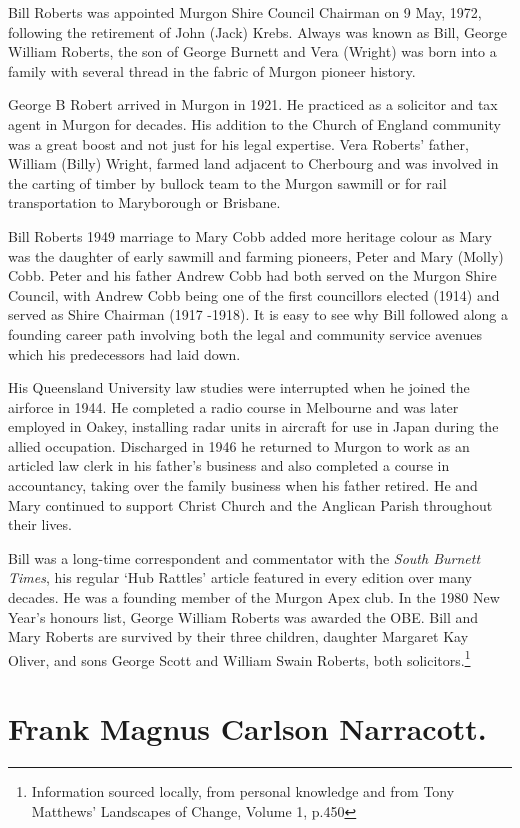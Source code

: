 Bill Roberts was appointed Murgon Shire Council Chairman on 9 May, 1972, following the retirement of John (Jack) Krebs. Always was known as Bill, George William Roberts, the son of George Burnett and Vera (Wright) was born into a family with several thread in the fabric of Murgon pioneer history.

George B Robert arrived in Murgon in 1921. He practiced as a solicitor and tax agent in Murgon for decades. His addition to the Church of England community was a great boost and not just for his legal expertise. Vera Roberts' father, William (Billy) Wright, farmed land adjacent to Cherbourg and was involved in the carting of timber by bullock team to the Murgon sawmill or for rail transportation to Maryborough or Brisbane.

Bill Roberts 1949 marriage to Mary Cobb added more heritage colour as Mary was the daughter of early sawmill and farming pioneers, Peter and Mary (Molly) Cobb. Peter and his father Andrew Cobb had both served on the Murgon Shire Council, with Andrew Cobb being one of the first councillors elected (1914) and served as Shire Chairman (1917 -1918). It is easy to see why Bill followed along a founding career path involving both the legal and community service avenues which his predecessors had laid down.

His Queensland University law studies were interrupted when he joined the airforce in 1944. He completed a radio course in Melbourne and was later employed in Oakey, installing radar units in aircraft for use in Japan during the allied occupation. Discharged in 1946 he returned to Murgon to work as an articled law clerk in his father's business and also completed a course in accountancy, taking over the family business when his father retired. He and Mary continued to support Christ Church and the Anglican Parish throughout their lives.

Bill was a long-time correspondent and commentator with the \emph{South Burnett Times}, his regular `Hub Rattles' article featured in every edition over many decades. He was a founding member of the Murgon Apex club. In the 1980 New Year's honours list, George William Roberts was awarded the OBE. Bill and Mary Roberts are survived by their three children, daughter Margaret Kay Oliver, and sons George Scott and William Swain Roberts, both solicitors.\footnote{Information sourced locally, from personal knowledge and from Tony Matthews' Landscapes of Change, Volume 1, p.450}

\hypertarget{frank-magnus-carlson-narracott.}{%
\section{Frank Magnus Carlson Narracott.}\label{frank-magnus-carlson-narracott.}}


